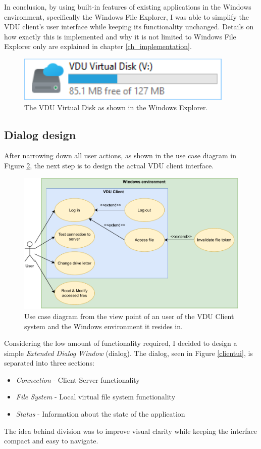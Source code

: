 In conclusion, by using built-in features of existing applications in the Windows environment, specifically the Windows File Explorer, I was able to simplify the VDU client's user interface while keeping its functionality unchanged. Details on how exactly this is implemented and why it is not limited to Windows File Explorer only are explained in chapter \ref{ch_implementation}.

\begin{figure}[htb]
    \centering
    \includegraphics[]{obrazky-figures/explorervdudisk.pdf}
	\caption{The VDU Virtual Disk as shown in the Windows Explorer.}
	\label{explorervdudisk}
\end{figure}

\subsection{Dialog design}
\label{dialogdesign}
After narrowing down all user actions, as shown in the use case diagram in Figure \ref{usecasediagr}, the next step is to design the actual VDU client interface.

\begin{figure}[htb]
    \centering
    \includegraphics[width=\columnwidth]{obrazky-figures/usecasediagr.pdf}
	\caption{Use case diagram from the view point of an user of the VDU Client system and the Windows environment it resides in.}
	\label{usecasediagr}
\end{figure}

 Considering the low amount of functionality required, I decided to design a simple \textit{Extended Dialog Window} (dialog). The dialog, seen in Figure \ref{clientui}, is separated into three sections:
 \begin{itemize}
     \item \textit{Connection} - Client-Server functionality
     \item \textit{File System} - Local virtual file system functionality
     \item \textit{Status} - Information about the state of the application
 \end{itemize}
The idea behind division was to improve visual clarity while keeping the interface compact and easy to navigate.

